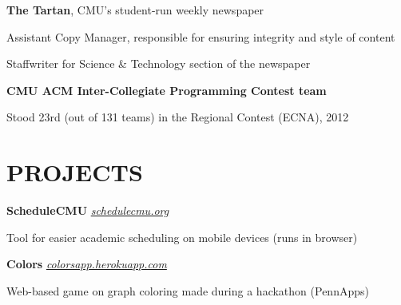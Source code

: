 \documentclass[margin, 11pt]{res} %
\begin{document}
\begin{resume}
\vspace{3pt}

{\bf The Tartan}, CMU's student-run weekly newspaper

\begin{itemize} \itemsep -2pt
{\small \item Assistant Copy Manager, responsible for ensuring integrity and style of content
\item Staffwriter for Science \& Technology section of the newspaper}
\end{itemize}

\vspace{3pt}

{\bf CMU ACM Inter-Collegiate Programming Contest team}
\begin{itemize} \itemsep -2pt
{\small \item Stood 23rd (out of 131 teams) in the Regional Contest (ECNA), 2012}
\end{itemize}

\section{PROJECTS}

{\bf ScheduleCMU} \href{www.schedulecmu.org}{\sl schedulecmu.org} 

\begin{itemize} \itemsep -2pt
{\small \item Tool for easier academic scheduling on mobile devices (runs in browser)}
\end{itemize}

\vspace{3pt}

{\bf Colors} \href{colorsapp.herokuapp.com}{\sl colorsapp.herokuapp.com}
\begin{itemize} \itemsep -2pt
{\small \item Web-based game on graph coloring made during a hackathon (PennApps)}
\end{itemize}




\end{resume}
\end{document}
